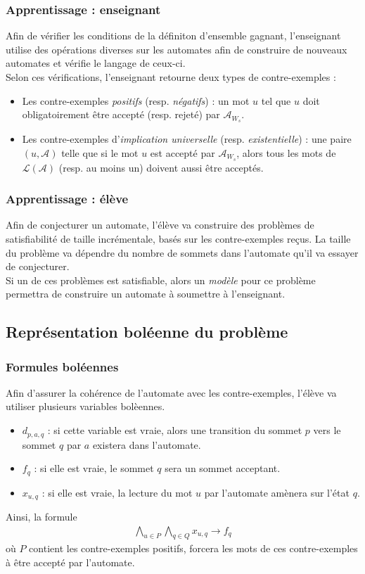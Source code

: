 \documentclass{beamer}
\begin{document}
\begin{frame}
\frametitle{Apprentissage : enseignant} %
Afin de vérifier les conditions de la définiton d'ensemble gagnant, l'enseignant utilise des opérations diverses sur les automates afin de construire de nouveaux automates et vérifie le langage de ceux-ci.\\[3mm]
Selon ces vérifications, l'enseignant retourne deux types de contre-exemples :
\begin{itemize}
\item Les contre-exemples \emph{positifs} (resp. \emph{négatifs}) : un mot $u$ tel que $u$ doit obligatoirement être accepté (resp. rejeté) par $\mathcal{A}_{W_s}$.
\item Les contre-exemples d'\emph{implication universelle} (resp. \emph{existentielle}) : une paire $(u, \mathcal{A})$ telle que si le mot $u$ est accepté par $\mathcal{A}_{W_s}$, alors tous les mots de $\mathcal{L}(\mathcal{A})$ (resp. au moins un) doivent aussi être acceptés.
\end{itemize}

\end{frame}

\begin{frame}
\frametitle{Apprentissage : élève} %
Afin de conjecturer un automate, l'élève va construire des problèmes de satisfiabilité de taille incrémentale, basés sur les contre-exemples reçus. La taille du problème va dépendre du nombre de sommets dans l'automate qu'il va essayer de conjecturer.\\[3mm]
Si un de ces problèmes est satisfiable, alors un \emph{modèle} pour ce problème permettra de construire un automate à soumettre à l'enseignant.
\end{frame}

\subsection{Représentation boléenne du problème}
\begin{frame}
\frametitle{Formules boléennes} %
Afin d'assurer la cohérence de l'automate avec les contre-exemples, l'élève va utiliser plusieurs variables bolèennes.
\begin{itemize}
\item $d_{p,a,q}$ : si cette variable est vraie, alors une transition du sommet $p$ vers le sommet $q$ par $a$ existera dans l'automate.
\item $f_q$ : si elle est vraie, le sommet $q$ sera un sommet acceptant.
\item $x_{u,q}$ : si elle est vraie, la lecture du mot $u$ par l'automate amènera sur l'état $q$.
\end{itemize}
Ainsi, la formule 
\begin{equation}
\label{boolPos}
\begin{aligned} \bigwedge_{u\in P} \bigwedge_{q\in Q} x_{u,q} \rightarrow f_q \end{aligned}
\end{equation} 
où $P$ contient les contre-exemples positifs, forcera les mots de ces contre-exemples à être accepté par l'automate.
\end{frame}
\end{document}
